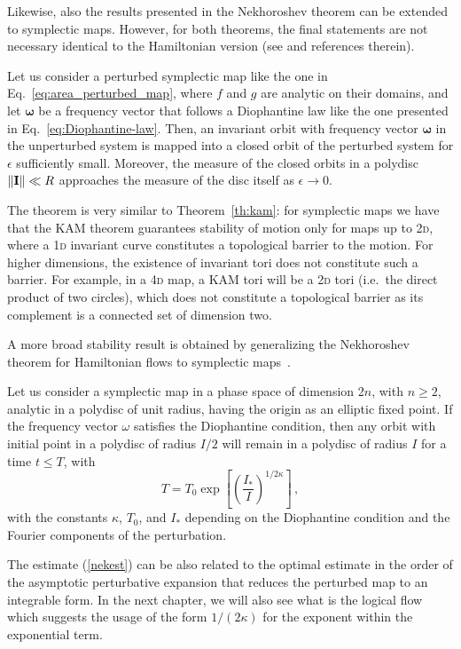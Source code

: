 Likewise, also the results presented in the Nekhoroshev theorem can be extended to symplectic maps. However, for both theorems, the final statements are not necessary identical to the Hamiltonian version (see \cite{Bazzani:262179} and references therein).

\begin{theorem}
    Let us consider a perturbed symplectic map like the one in Eq.~\eqref{eq:area_perturbed_map}, where $f$ and $g$ are analytic on their domains, and let $\boldsymbol{\omega}$ be a frequency vector that follows a Diophantine law like the one presented in Eq.~\eqref{eq:Diophantine-law}. Then, an invariant orbit with frequency vector $\boldsymbol{\omega}$ in the unperturbed system is mapped into a closed orbit of the perturbed system for $\epsilon$ sufficiently small. Moreover, the measure of the closed orbits in a polydisc $\norm{\vb{I}} \ll R$ approaches the measure of the disc itself as $\epsilon \to 0$. 
\end{theorem}

The theorem is very similar to Theorem~\ref{th:kam}: for symplectic maps we have that the KAM theorem guarantees stability of motion only for maps up to 2\textsc{d}, where a 1\textsc{d} invariant curve constitutes a topological barrier to the motion. For higher dimensions, the existence of invariant tori does not constitute such a barrier. For example, in a 4\textsc{d} map, a KAM tori will be a 2\textsc{d} tori (i.e.\ the direct product of two circles), which does not constitute a topological barrier as its complement is a connected set of dimension two.

A more broad stability result is obtained by generalizing the Nekhoroshev theorem for Hamiltonian flows to symplectic maps~\cite{Bazzani:1990aa, Turchetti:1990aa}.

\begin{theorem}
    Let us consider a symplectic map in a phase space of dimension 2$n$, with $n\geq 2$, analytic in a polydisc of unit radius, having the origin as an elliptic fixed point. If the frequency vector $\omega$ satisfies the Diophantine condition, then any orbit with initial point in a polydisc of radius $I/2$ will remain in a polydisc of radius $I$ for a time $t\leq T$, with
    \begin{equation}
    \label{nekest}
        T = T_0 \exp\left[\left(\frac{I_\ast}{I}\right)^{1/2\kappa}\right]\,,
    \end{equation}
    with the constants $\kappa$, $T_0$, and $I_\ast$ depending on the Diophantine condition and the Fourier components of the perturbation.
\end{theorem}
The estimate (\ref{nekest}) can be also related to the optimal estimate in the order of the asymptotic perturbative expansion that reduces the perturbed map to an integrable form. In the next chapter, we will also see what is the logical flow which suggests the usage of the form $1/(2\kappa)$ for the exponent within the exponential term. 